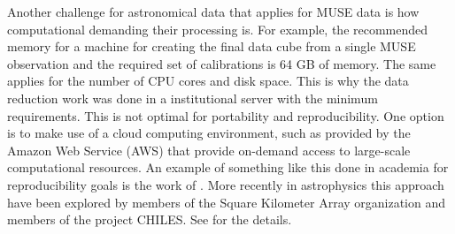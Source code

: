 Another challenge for astronomical data that applies for MUSE data is how computational demanding their processing is. For example, the recommended memory for a machine for creating the final data cube from a single MUSE observation and the required set of calibrations is 64 GB of memory. The same applies for the number of CPU cores and disk space. This is why the data reduction work was done in a institutional server with the minimum requirements. This is not optimal for portability and reproducibility. One option is to make use of a cloud computing environment, such as provided by the Amazon Web Service (AWS) that provide on-demand access to large-scale computational resources. An example of something like this done in academia for reproducibility goals is the work of \cite{ragan-kelley_collaborative_2013}. More recently in astrophysics this approach have been explored by members of the Square Kilometer Array organization and members of the project CHILES. See \cite{Dodson_SKAAmazon_2016} for the details. 

